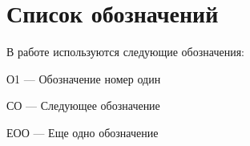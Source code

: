 \chapter*{Список обозначений}

\noindent В работе используются следующие обозначения:

\noindent О1 --- Обозначение номер один

\noindent СО --- Следующее обозначение

\noindent ЕОО --- Еще одно обозначение
